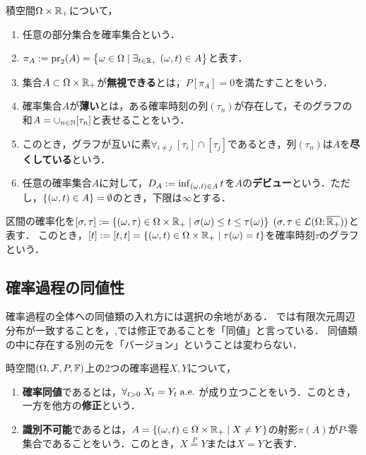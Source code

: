 \documentclass[uplatex,dvipdfmx]{jsreport}
\begin{document}
\begin{definition}
    積空間$\Omega\times\mathbb{R}_+$について，
    \begin{enumerate}
        \item 任意の部分集合を確率集合という．
        \item $\pi_A:=\mathrm{pr}_2(A)=\left\{\omega\in\Omega\mid\exists_{t\in\mathbb{R}_+}\;(\omega,t)\in A\right\}$と表す．
        \item 集合$A\subset\Omega\times\mathbb{R}_+$が\textbf{無視できる}とは，$P[\pi_A]=0$を満たすことをいう．
        \item 確率集合$A$が\textbf{薄い}とは，ある確率時刻の列$(\tau_n)$が存在して，そのグラフの和$A=\cup_{n\in\mathbb{N}}[\tau_n]$と表せることをいう．
        \item このとき，グラフが互いに素$\forall_{i\ne j}\;[\tau_i]\cap[\tau_j]$であるとき，列$(\tau_n)$は$A$を\textbf{尽くしている}という．
        \item 任意の確率集合$A$に対して，$D_A:=\inf_{(\omega,t)\in A}t$を$A$の\textbf{デビュー}という．ただし，$\left\{(\omega,t)\in A\right\}=\emptyset$のとき，下限は$\infty$とする．
    \end{enumerate}
\end{definition}

\begin{example}
    区間の確率化を$[\sigma,\tau]:=\left\{(\omega,\tau)\in\Omega\times\mathbb{R}_+\mid\sigma(\omega)\le t\le\tau(\omega)\right\}\;(\sigma,\tau\in\mathcal{L}(\Omega;\overline{\mathbb{R}_+}))$と表す．
    このとき，$[t]:=[t,t]=\left\{(\omega,t)\in\Omega\times\mathbb{R}_+\mid\tau(\omega)=t\right\}$を確率時刻$\tau$のグラフという．
\end{example}

\subsection{確率過程の同値性}

\begin{tcolorbox}[colframe=ForestGreen, colback=ForestGreen!10!white,breakable,colbacktitle=ForestGreen!40!white,coltitle=black,fonttitle=\bfseries\sffamily,
title=]
    確率過程の全体への同値類の入れ方には選択の余地がある．
    \cite{Revus and Yor}では有限次元周辺分布が一致することを，\cite{Nualart},\cite{Prato}では修正であることを「同値」と言っている．
    同値類の中に存在する別の元を「バージョン」ということは変わらない．
\end{tcolorbox}

\begin{definition}
    時空間$(\Omega,\mathcal{F},P,\mathbb{F})$上の2つの確率過程$X,Y$について，
    \begin{enumerate}
        \item \textbf{確率同値}であるとは，$\forall_{t>0}\;X_t=Y_t\;\mathrm{a.e.}\;$が成り立つことをいう．このとき，一方を他方の\textbf{修正}という．
        \item \textbf{識別不可能}であるとは，$A=\left\{(\omega,t)\in\Omega\times\mathbb{R}_+\mid X\ne Y\right\}$の射影$\pi(A)$が$P$-零集合であることをいう．このとき，$X\overset{P}{=}Y$または$X=Y$と表す．
    \end{enumerate}
\end{definition}
\end{document}
